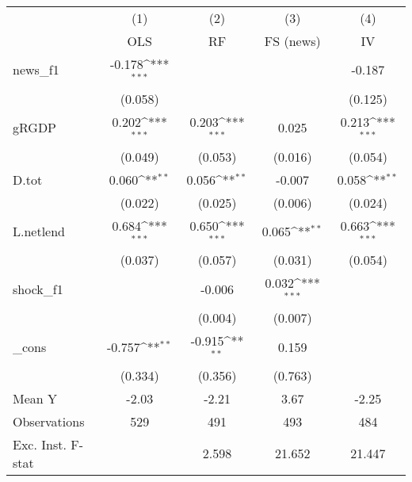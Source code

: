 {
\def\sym#1{\ifmmode^{#1}\else\(^{#1}\)\fi}
\begin{tabular}{l*{4}{c}}
\toprule
            &\multicolumn{1}{c}{(1)}&\multicolumn{1}{c}{(2)}&\multicolumn{1}{c}{(3)}&\multicolumn{1}{c}{(4)}\\
            &\multicolumn{1}{c}{OLS}&\multicolumn{1}{c}{RF}&\multicolumn{1}{c}{FS (news)}&\multicolumn{1}{c}{IV}\\
\midrule
news\_f1     &      -0.178\sym{***}&                     &                     &      -0.187         \\
            &     (0.058)         &                     &                     &     (0.125)         \\
\addlinespace
gRGDP       &       0.202\sym{***}&       0.203\sym{***}&       0.025         &       0.213\sym{***}\\
            &     (0.049)         &     (0.053)         &     (0.016)         &     (0.054)         \\
\addlinespace
D.tot       &       0.060\sym{**} &       0.056\sym{**} &      -0.007         &       0.058\sym{**} \\
            &     (0.022)         &     (0.025)         &     (0.006)         &     (0.024)         \\
\addlinespace
L.netlend   &       0.684\sym{***}&       0.650\sym{***}&       0.065\sym{**} &       0.663\sym{***}\\
            &     (0.037)         &     (0.057)         &     (0.031)         &     (0.054)         \\
\addlinespace
shock\_f1    &                     &      -0.006         &       0.032\sym{***}&                     \\
            &                     &     (0.004)         &     (0.007)         &                     \\
\addlinespace
\_cons      &      -0.757\sym{**} &      -0.915\sym{**} &       0.159         &                     \\
            &     (0.334)         &     (0.356)         &     (0.763)         &                     \\
\midrule
Mean Y      &       -2.03         &       -2.21         &        3.67         &       -2.25         \\
Observations&         529         &         491         &         493         &         484         \\
Exc. Inst. F-stat&                     &       2.598         &      21.652         &      21.447         \\
\bottomrule
\end{tabular}
}
